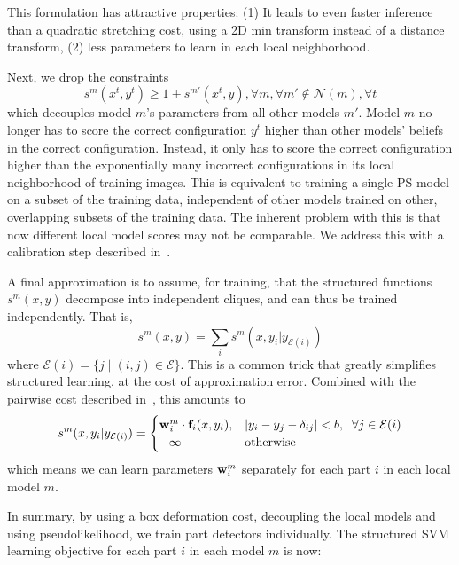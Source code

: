 This formulation has attractive properties: (1) It leads to even faster inference than a quadratic stretching cost, using a 2D min transform instead of a distance transform, (2) less parameters to learn in each local neighborhood.

 Next, we drop the constraints
$$s^m(x^t,y^t) \geq 1 + s^{m'}(x^t,y), \forall m, \forall m'\notin 
\mathcal{N}(m),\forall t$$ which decouples model $m$'s parameters from all 
other models $m'$.  Model $m$ no longer has to score the correct configuration 
$y^t$ higher than other models' beliefs in the correct configuration.  Instead, 
it only has to score the correct configuration higher than the exponentially 
many incorrect configurations in its local neighborhood of training images.  
This is equivalent to training a single PS model on a subset of the training 
data, independent of other models trained on other, overlapping subsets of the 
training data.  The inherent problem with this is that now different local 
model scores may not be comparable.  We address this with a calibration step 
described in~.

 A final approximation is to assume, for training, that the structured functions $s^m(x,y)$ decompose into independent cliques, and can thus be trained independently.  That is,
$$ s^m(x,y) = \sum_{i} s^m(x,y_i | y_{\mathcal{E}(i)}) $$ 
where $\mathcal{E}(i) = \{j \;|\; (i,j) \in \mathcal{E}\}$.  This is a common 
trick that greatly simplifies structured learning, at the cost of approximation 
error.  Combined with the pairwise cost described in~, this 
amounts to
$$s^m(x,y_i| y_{\mathcal{E}(i)}) = 
\begin{cases}
 \mathbf{w}^m_i \cdot \mathbf{f}_i(x,y_i), & |y_i - y_j - \delta_{ij}| < b,\;\; \forall j \in 
\mathcal{E}(i) \\
 -\infty & \text{otherwise}
\end{cases}
$$
which means we can learn parameters $\mathbf{w}_i^m$ separately for each part $i$ in 
each local model $m$.

In summary, by using a box deformation cost, decoupling the local models and using pseudolikelihood, we train part detectors individually.  The structured SVM learning objective for each part $i$ in each model $m$ is now:

